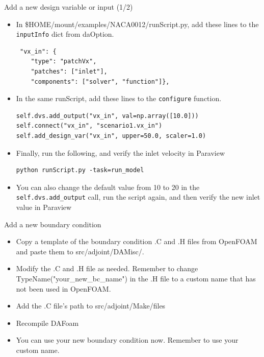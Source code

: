 \documentclass{bredelebeamer}
\begin{document}
\begin{frame}[fragile]{Add a new design variable or input (1/2)}

\begin{itemize}
  \item In \$HOME/mount/examples/NACA0012/runScript.py, add these lines to the \texttt{inputInfo} dict from daOption.
  \begin{lstlisting}
 "vx_in": {
    "type": "patchVx",
    "patches": ["inlet"],
    "components": ["solver", "function"]},
 \end{lstlisting}
 \item In the same runScript, add these lines to the \texttt{configure} function.
\begin{lstlisting}
self.dvs.add_output("vx_in", val=np.array([10.0]))
self.connect("vx_in", "scenario1.vx_in")
self.add_design_var("vx_in", upper=50.0, scaler=1.0)
 \end{lstlisting}
\item Finally, run the following, and verify the inlet velocity in Paraview
 \begin{lstlisting}
python runScript.py -task=run_model
\end{lstlisting}
\item You can also change the default value from 10 to 20 in the \texttt{self.dvs.add\_output} call, run the script again, and then verify the new inlet value in Paraview
\end{itemize}

\end{frame}


\begin{frame}[fragile]{Add a new boundary condition}

\begin{itemize}
  \item Copy a template of the boundary condition .C and .H files from OpenFOAM and paste them to src/adjoint/DAMisc/.
  \item Modify the .C and .H file as needed. Remember to change TypeName("your\_new\_bc\_name") in the .H file to a custom name that has not been used in OpenFOAM.
  \item Add the .C file's path to src/adjoint/Make/files
  \item Recompile DAFoam
  \item You can use your new boundary condition now. Remember to use your custom name.
\end{itemize}

\end{frame}
\end{document}
